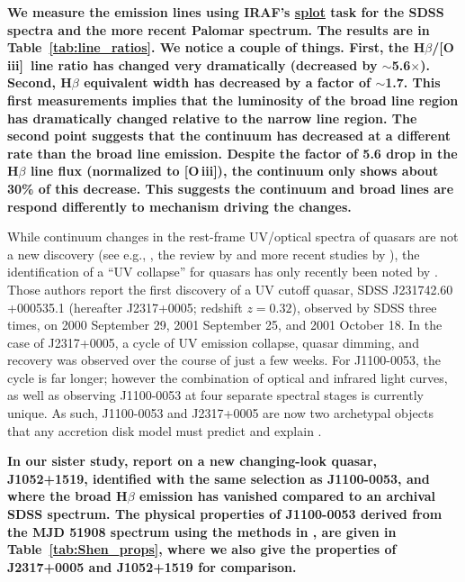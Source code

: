 \documentclass[a4paper,fleqn,usenatbib]{mnras}
\begin{document}
{\bf
We measure the emission lines using IRAF's
\href{http://stsdas.stsci.edu/cgi-bin/gethelp.cgi?splot.hlp}{splot}
task for the SDSS spectra and the more recent Palomar
spectrum. The results are in Table~\ref{tab:line_ratios}. 
We notice a couple of things.  First, the H$\beta$/[O\,{\sc
iii}]\ line ratio has changed very dramatically (decreased by
$\sim$5.6$\times$).  Second, H$\beta$ equivalent width has decreased
by a factor of $\sim$1.7.
This first measurements implies that the luminosity of the broad line
region has dramatically changed relative to the narrow line region.
The second point suggests that the continuum has decreased at a
different rate than the broad line emission. Despite the factor of 5.6
drop in the H$\beta$ line flux (normalized to [O\,{\sc iii}]), the
continuum only shows about 30\% of this decrease.  This suggests the
continuum and broad lines are respond differently to mechanism driving
the changes. }

While continuum changes in the rest-frame UV/optical spectra of
quasars are not a new discovery (see e.g., \cite{Clavel1991}, the
review by \cite{Ulrich1997} and more recent studies by
\cite{VandenBerk2004, Pereyra2006, MacLeod2010, Guo2016b}), the
identification of a ``UV collapse'' for quasars has only recently been
noted by \cite{Guo2016}.  Those authors report the first discovery of
a UV cutoff quasar, SDSS J231742.60 +000535.1 (hereafter J2317+0005;
redshift $z = 0.32$), observed by SDSS three times, on 2000 September
29, 2001 September 25, and 2001 October 18. In the case of J2317+0005,
a cycle of UV emission collapse, quasar dimming, and recovery was
observed over the course of just a few weeks. For J1100-0053, the
cycle is far longer; however the combination of optical and infrared
light curves, as well as observing J1100-0053 at four separate
spectral stages is currently unique. 
%
As such, J1100-0053 and
J2317+0005 are now two archetypal objects that any accretion disk
model must predict and explain \cite{Lawrence2018}.

{\bf In our sister study, \citet{Stern2018} report on a new changing-look quasar, 
J1052+1519, identified with the same selection as 
J1100-0053, and where the broad H$\beta$ emission has vanished
compared to an archival SDSS spectrum. 
%
The physical 
properties of J1100-0053 derived from the MJD 51908 spectrum using the
methods in \citet{Shen2011}, are given in Table~\ref{tab:Shen_props},
where we also give the properties of J2317+0005 and J1052+1519 for comparison.
}
\end{document}
